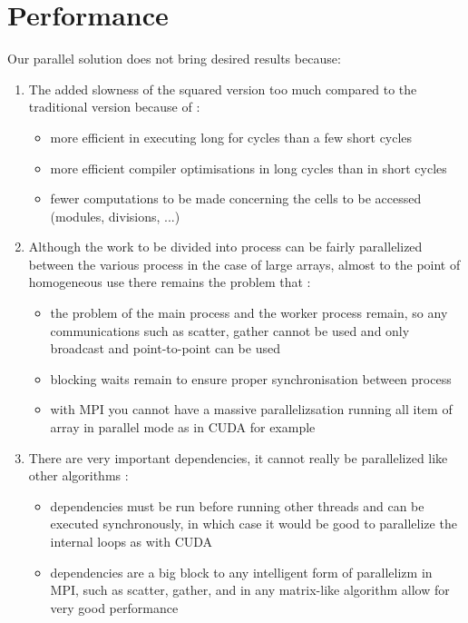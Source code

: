 \section{Performance}\label{performance}

Our parallel solution does not bring desired results because:
\begin{enumerate}
    \item \label{overhead-squared} The added slowness of the squared version too much compared to the traditional version because of \cite{rucci}: 
    \begin{itemize}
        \item more efficient in executing long for cycles than a few short cycles
        \item more efficient compiler optimisations in long cycles than in short cycles
        \item fewer computations to be made concerning the cells to be accessed (modules, divisions, ...)
    \end{itemize}
    \item \label{overhead-mpi} Although the work to be divided into process can be fairly parallelized between the various process in the case of large arrays, almost to the point of homogeneous use there remains the problem that \cite{koallen}:
    \begin{itemize}
        \item the problem of the main process and the worker process remain, so any communications such as scatter, gather cannot be used and only broadcast and point-to-point can be used
        \item blocking waits remain to ensure proper synchronisation between process
        \item with MPI you cannot have a massive parallelizsation running all item of array in parallel mode  as in CUDA for example
    \end{itemize}
    \item \label{overhead-dependencies} There are very important dependencies, it cannot really be parallelized like other algorithms \cite{rucci}:
    \begin{itemize}
        \item dependencies must be run before running other threads and can be executed synchronously, in which case it would be good to parallelize the internal loops as with CUDA
        \item dependencies are a big block to any intelligent form of parallelizm in MPI, such as scatter, gather, and in any matrix-like algorithm allow for very good performance

\end{itemize}
\end{enumerate}
